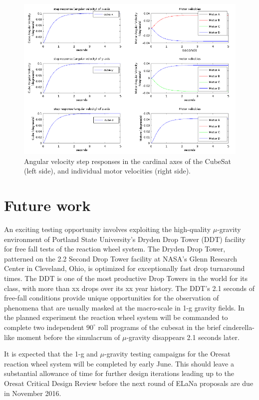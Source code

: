 \documentclass[]{aiaa-tc}%
\begin{document}
\begin{figure}[h!]
  \centering
  \includegraphics[width=0.9\linewidth]{simulation.png}
  \caption{Angular velocity step responses in the cardinal axes of the CubeSat (left side), and individual motor velocities (right side).}
  \label{fig:simulation}
\end{figure}
\section{Future work}
An exciting testing opportunity involves exploiting the high-quality $\mu$-gravity environment of Portland State University's Dryden Drop Tower (DDT) facility for free fall tests of the reaction wheel system. The Dryden Drop Tower, patterned on the 2.2 Second Drop Tower facility at NASA's Glenn Research Center in Cleveland, Ohio, is optimized for exceptionally fast drop turnaround times. The DDT is one of the most productive Drop Towers in the world for its class, with more than xx drops over its xx year history. The DDT's 2.1 seconds of free-fall conditions provide unique opportunities for the observation of phenomena that are usually masked at the macro-scale in 1-g gravity fields. In the planned experiment the reaction wheel system will be commanded to complete two independent $90^{\circ}$ roll programs of the cubesat in the brief cinderella-like moment before the simulacrum of $\mu$-gravity disappears 2.1 seconds later.

It is expected that the 1-g and $\mu$-gravity testing campaigns for the Oresat reaction wheel system will be completed by early June. This should leave a substantial allowance of time for further design iterations leading up to the Oresat Critical Design Review before the next round of ELaNa proposals are due in November 2016.
\end{document}
